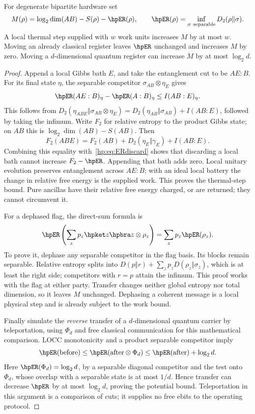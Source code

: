 \begin{lemma}\label{hp:lem:potential}
For degenerate bipartite hardware set
\[
 M(\rho)=\log_2\dim(AB)-S(\rho)-\hpER(\rho),\qquad
 \hpER(\rho)=\inf_{\sigma\ {\rm separable}}D_2(\rho\Vert\sigma).
\]
A local thermal step supplied with $w$ work units increases $M$ by at most $w$. Moving an already classical register leaves $\hpER$ unchanged and increases $M$ by zero. Moving a $d$-dimensional quantum register can increase $M$ by at most $\log_2d$.
\end{lemma}
\begin{proof}
Append a local Gibbs bath $E$, and take the entanglement cut to be $AE:B$. For its final state $\eta$, the separable competitor $\sigma_{AB}\otimes\eta_E$ gives
\begin{equation}
 \hpER(AE:B)_\eta-\hpER(A:B)_\eta\le I(AB:E)_\eta.\label{hp:eq:ERdiscard}
\end{equation}
This follows from
$D_2(\eta_{ABE}\Vert\sigma_{AB}\otimes\eta_E)
=D_2(\eta_{AB}\Vert\sigma_{AB})+I(AB:E)$,
followed by taking the infimum. Write $F_2$ for relative entropy to the product Gibbs state; on $AB$ this is $\log_2\dim(AB)-S(AB)$. Then
\[
 F_2(ABE)=F_2(AB)+D_2(\eta_E\Vert\gamma_E)+I(AB:E).
\]
Combining this equality with~\eqref{hp:eq:ERdiscard} shows that discarding a local bath cannot increase $F_2-\hpER$. Appending that bath adds zero. Local unitary evolution preserves entanglement across $AE:B$; with an ideal local battery the change in relative free energy is the supplied work. This proves the thermal-step bound. Pure ancillas have their relative free energy charged, or are returned; they cannot circumvent it.

For a dephased flag, the direct-sum formula is
\[
 \hpER\left(\sum_zp_z\hpket z\hpbra z\otimes\rho_z\right)
       =\sum_zp_z\hpER(\rho_z).
\]
To prove it, dephase any separable competitor in the flag basis. Its blocks remain separable. Relative entropy splits into $D(p\Vert r)+\sum_zp_zD(\rho_z\Vert\sigma_z)$, which is at least the right side; competitors with $r=p$ attain the infimum. This proof works with the flag at either party. Transfer changes neither global entropy nor total dimension, so it leaves $M$ unchanged. Dephasing a coherent message is a local physical step and is already subject to the work bound.

Finally simulate the \emph{reverse} transfer of a $d$-dimensional quantum carrier by teleportation, using $\Phi_d$ and free classical communication for this mathematical comparison. LOCC monotonicity and a product separable competitor imply
\[
 \hpER({\rm before})\le\hpER({\rm after}\otimes\Phi_d)
 \le\hpER({\rm after})+\log_2d.
\]
Here $\hpER(\Phi_d)=\log_2d$, by a separable diagonal competitor and the test onto $\Phi_d$, whose overlap with a separable state is at most $1/d$. Hence transfer can decrease $\hpER$ by at most $\log_2d$, proving the potential bound. Teleportation in this argument is a comparison of cuts; it supplies no free ebits to the operating protocol.
\end{proof}

